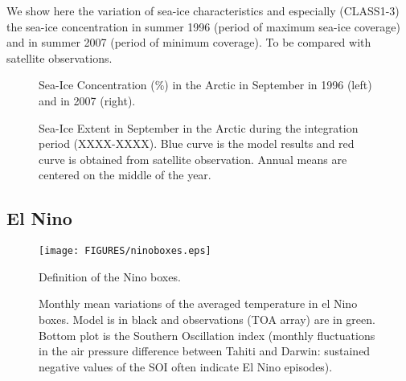 We show here the variation of sea-ice characteristics and especially (CLASS1-3) the sea-ice concentration in 
summer 1996 (period of maximum sea-ice coverage) and in summer 2007 (period of minimum coverage). To be compared with satellite observations.

\begin{figure}[H]
\begin{center}
\begin{minipage}{0.47\linewidth}
\end{minipage}
\hfill
\begin{minipage}{0.47\linewidth}
\end{minipage}
\caption{Sea-Ice Concentration (\%) in the Arctic in September in 1996 (left) and in 2007 (right).}
\end{center}
\end{figure}

\begin{figure}[H]
\begin{center}
\caption{Sea-Ice Extent in September in the Arctic during the integration period (XXXX-XXXX). Blue curve is the model results and 
red curve is obtained from satellite observation. Annual means are centered on the middle of the year.}
\end{center}
\end{figure}

\subsection{El Nino}

\begin{figure}[H]
\begin{center}
\texttt{[image: FIGURES/ninoboxes.eps]}
\caption{Definition of the Nino boxes.}
\end{center}
\end{figure}

\begin{figure}[H]
\begin{center}
\caption{Monthly mean variations of the averaged temperature in el Nino boxes. Model is 
in black and observations (TOA array) are in green. Bottom plot is the Southern Oscillation 
index (monthly fluctuations in the air pressure difference between Tahiti and Darwin: sustained negative values of the SOI often indicate El Nino episodes).}
\end{center}
\end{figure}

